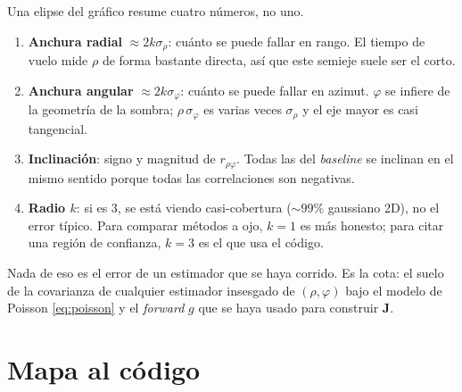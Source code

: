 \documentclass[11pt,a4paper]{article}
\newcommand{\matr}[1]{\mathbf{#1}}
\theoremstyle{definition}
\theoremstyle{plain}
\begin{document}
Una elipse del gr\'afico resume cuatro n\'umeros, no uno.
%
\begin{enumerate}[leftmargin=*]
  \item \textbf{Anchura radial} $\approx 2k\sigma_\rho$: cu\'anto se puede
        fallar en rango. El tiempo de vuelo mide $\rho$ de forma bastante
        directa, as\'i que este semieje suele ser el corto.
  \item \textbf{Anchura angular} $\approx 2k\sigma_\varphi$: cu\'anto se puede
        fallar en azimut. $\varphi$ se infiere de la geometr\'ia de la sombra;
        $\rho\,\sigma_\varphi$ es varias veces $\sigma_\rho$ y el eje mayor
        es casi tangencial.
  \item \textbf{Inclinaci\'on}: signo y magnitud de $r_{\rho\varphi}$. Todas
        las del \emph{baseline} se inclinan en el mismo sentido porque todas
        las correlaciones son negativas.
  \item \textbf{Radio $k$}: si es $3$, se est\'a viendo casi-cobertura
        ($\sim 99\%$ gaussiano 2D), no el error t\'ipico. Para comparar
        m\'etodos a ojo, $k=1$ es m\'as honesto; para citar una regi\'on de
        confianza, $k=3$ es el que usa el c\'odigo.
\end{enumerate}

Nada de eso es el error de un estimador que se haya corrido. Es la cota: el
suelo de la covarianza de cualquier estimador insesgado de $(\rho,\varphi)$
bajo el modelo de Poisson \eqref{eq:poisson} y el \emph{forward} $g$ que se
haya usado para construir $\matr J$.

\section{Mapa al c\'odigo}
\label{sec:mapa}
\end{document}
